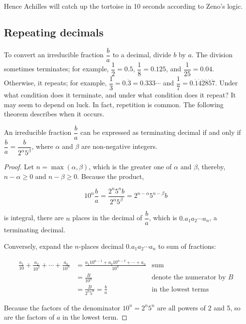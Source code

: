 \documentclass[b5paper]{article}
\begin{document}
Hence Achilles will catch up the tortoise in 10 seconds according to Zeno's logic.

\subsection{Repeating decimals}
To convert an irreducible fraction $\dfrac{b}{a}$ to a decimal, divide $b$ by $a$. The division sometimes terminates; for example, $\dfrac{1}{2}=0.5$, $\dfrac{1}{8}=0.125$, and $\dfrac{1}{25}=0.04$. Otherwise, it repeats; for example, $\dfrac{1}{3}=0.\dot{3}=0.333\cdots$ and $\dfrac{1}{7}=0.\dot{1}\dot{4}\dot{2}\dot{8}\dot{5}\dot{7}$. Under what condition does it terminate, and under what condition does it repeat? It may seem to depend on luck. In fact, repetition is common. The following theorem describes when it occurs.

\begin{theorem} \label{thm:finite-decimal}
  An irreducible fraction $\dfrac{b}{a}$ can be expressed as terminating decimal if and only if $\dfrac{b}{a} = \dfrac{b}{2^{\alpha}5^{\beta}}$, where $\alpha$ and $\beta$ are non-negative integers.
\end{theorem}

\begin{proof}
Let $n = \max(\alpha, \beta)$, which is the greater one of $\alpha$ and $\beta$, thereby, $n - \alpha \geq 0$ and $n - \beta \geq 0$. Because the product,

\[
10^n \frac{b}{a} = \frac{2^n 5^n b}{2^{\alpha} 5^{\beta}} = 2^{n - \alpha} 5 ^{n - \beta} b
\]

is integral, there are $n$ places in the decimal of $\dfrac{b}{a}$, which is $0.a_1 a_2 \cdots a_n$, a terminating decimal.

Conversely, expand the $n$-places decimal $0.a_1 a_2 \cdots a_n$ to sum of fractions:

\begin{align*}
\frac{a_1}{10} + \frac{a_2}{10^2} + \cdots + \frac{a_n}{10^n} &= \frac{a_1 10^{n-1} + a_2 10^{n-2} + \cdots + a_n}{10^n} & \text{sum} \\
  &= \frac{B}{10^n} & \text{denote the numerator by }B \\
  &= \frac{B}{2^n 5^n} = \frac{b}{a} & \text{in the lowest terms}
\end{align*}

Because the factors of the denominator $10^n = 2^n 5^n$ are all powers of 2 and 5, so are the factors of $a$ in the lowest term.
\end{proof}
\end{document}
